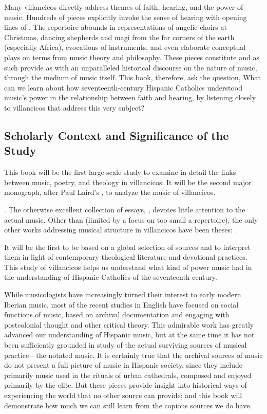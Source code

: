 \documentclass{vcbook-proposal}
\begin{document}
Many villancicos directly address themes of faith, hearing, and the power of music.
Hundreds of pieces explicitly invoke the sense of hearing with opening lines of   .
The repertoire abounds in representations of angelic choirs at Christmas, dancing shepherds and magi from the far corners of the earth (especially Africa), evocations of instruments, and even elaborate conceptual plays on terms from music theory and philosophy.
These pieces constitute  and as such provide as with an unparalleled historical discourse on the nature of music, through the medium of music itself.
This book, therefore, ask the question,
What can we learn about how seventeenth-century Hispanic Catholics understood music's power in the relationship between faith and hearing, by listening closely to villancicos that address this very subject?

\subsection{Scholarly Context and Significance of the Study}

This book will be the first large-scale study to examine in detail the links between music, poetry, and theology in villancicos.
It will be the second major monograph, after Paul Laird's , to analyze the music of villancicos.%
  \begin{Footnote}
  \autocite{Laird:VC}. 
  The otherwise excellent collection of essays, \autocite{Knighton-Torrente:VCs}, devotes little attention to the actual music.
  Other than \autocite{Rubio:Forma} (limited by a focus on too small a repertoire), the only other works addressing musical structure in villancicos have been theses: \autocites{CaberoPueyo:PhD}{Illari:Polychoral}.
  \end{Footnote}
It will be the first to be based on a global selection of sources and to interpret them in light of contemporary theological literature and devotional practices.
This study of villancicos helps us understand what kind of power music had in the understanding of Hispanic Catholics of the seventeenth century.

While musicologists have increasingly turned their interest to early modern Iberian music, most of the recent studies in English have focused on social functions of music, based on archival documentation and engaging with postcolonial thought and other critical theory.
This admirable work has greatly advanced our understanding of Hispanic music, but at the same time it has not been sufficiently grounded in study of the actual surviving sources of musical practice---the notated music.%
  \autocites{Torrente:PhD}{Baker:Harmony}{Irving:Colonial}
  {BakerKnighton:MusicUrbanSociety}
It is certainly true that the archival sources of music do not present a full picture of music in Hispanic society, since they include primarily music used in the rituals of urban cathedrals, composed and enjoyed primarily by the elite.
But these pieces provide insight into historical ways of experiencing the world that no other source can provide; and this book will demonstrate how much we can still learn from the copious sources we do have.
\end{document}

